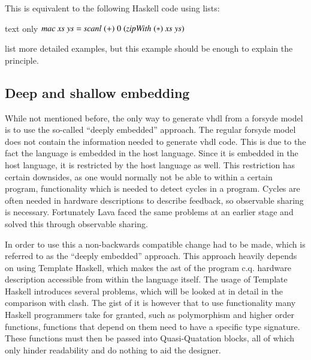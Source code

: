 This is equivalent to the following Haskell code using lists:
\begin{changemargin}{1cm}{0cm}
\begin{expansionno}{text only}
\ensuremath{\Varid{mac}\;\Varid{xs}\;\Varid{ys}\mathrel{=}\Varid{scanl}\;(\mathbin{+})\;\mathrm{0}\;(\Varid{zipWith}\;(\mathbin{*})\;\Varid{xs}\;\Varid{ys})}
\end{expansionno}
\end{changemargin}
\citeauthor{sander2004system} list\cite{sander2004system} more detailed examples, but this example should be enough to explain the principle.

\subsection{Deep and shallow embedding}
While not mentioned before, the only way to generate \gls{vhdl} from a \gls{forsyde} model is to use the so-called ``deeply embedded'' approach. 
The regular \gls{forsyde} model does not contain the information needed to generate \gls{vhdl} code.
This is due to the fact the language is embedded in the host language.
Since it is embedded in the host language, it is restricted by the host language as well.
This restriction has certain downsides, as one would normally not be able to  within a certain program, functionality which is needed to detect cycles in a program.
Cycles are often needed in hardware descriptions to describe feedback, so observable sharing is necessary.
Fortunately Lava\cite{claessen2002embedded,bjesse1998lava} faced the same problems at an earlier stage and solved this through observable sharing\cite{claessen1999observable}.

In order to use this a non-backwards compatible change had to be made, which is referred to as the ``deeply embedded'' approach. 
This approach heavily depends on using Template Haskell, which makes the \gls{ast} of the program c.q. hardware description accessible from within the language itself.
The usage of Template Haskell introduces several problems, which will be looked at in detail in the comparison with \gls{clash}.
The gist of it is however that to use functionality many Haskell programmers take for granted, such as polymorphism and higher order functions, functions that depend on them need to have a specific type signature.
These functions must then be passed into Quasi-Quatation\cite{sheard2002template} blocks, all of which only hinder readability and do nothing to aid the designer.

